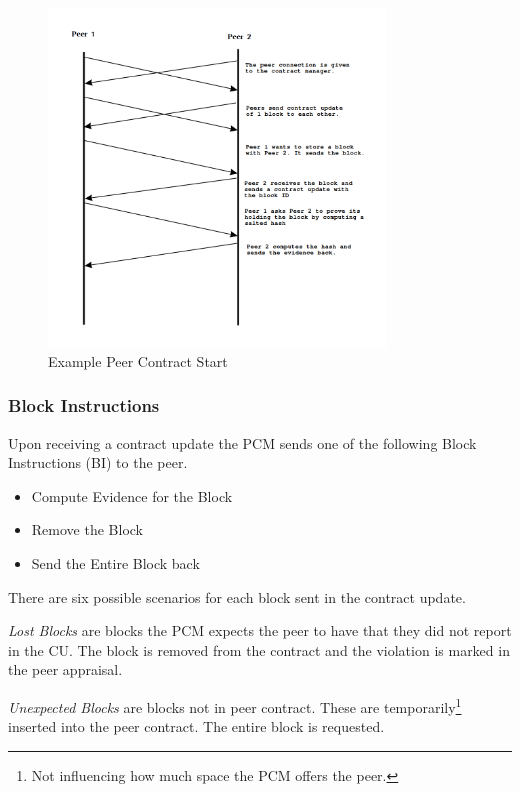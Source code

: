 \documentclass[11pt, a4paper, twocolumn, twoside]{report}
\begin{document}
\begin{figure}[h]
 \centering
 \includegraphics[width=0.8\textwidth]{contract-start}
 \caption{Example Peer Contract Start}
 \label{fig:contract-start}
\end{figure}

\subsubsection{Block Instructions}

Upon receiving a contract update the PCM sends one of the following Block Instructions (BI) to the peer.

\begin{itemize}
  \item Compute Evidence for the Block
  \item Remove the Block
  \item Send the Entire Block back
\end{itemize}

There are six possible scenarios for each block sent in the contract update.

\emph{Lost Blocks} are blocks the PCM expects the peer to have that they did not report in the CU. The block is removed from the contract and the violation is marked in the peer appraisal.

\emph{Unexpected Blocks} are blocks not in peer contract. These are temporarily\footnote{Not influencing how much space the PCM offers the peer.} inserted into the peer contract. The entire block is requested.
\end{document}
